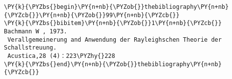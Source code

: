\begin{Verbatim}[commandchars=\\\{\}]
\PY{k}{\PYZbs{}begin}\PY{n+nb}{\PYZob{}}thebibliography\PY{n+nb}{\PYZcb{}}\PY{n+nb}{\PYZob{}}99\PY{n+nb}{\PYZcb{}}
\PY{k}{\PYZbs{}bibitem}\PY{n+nb}{\PYZob{}}1\PY{n+nb}{\PYZcb{}} Bachmann W , 1973.
 Verallgemeinerung and Anwendung der Rayleighschen Theorie der Schallstreuung.
 Acustica,28 (4)：223\PYZhy{}228
\PY{k}{\PYZbs{}end}\PY{n+nb}{\PYZob{}}thebibliography\PY{n+nb}{\PYZcb{}}
\end{Verbatim}

